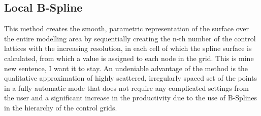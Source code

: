 \subsection{Local B-Spline}
\label{local_b_spline}

This method creates the smooth, parametric representation of the surface over the entire modelling area by sequentially creating the n-th number of the control lattices with the increasing resolution, in each cell of which the spline surface is calculated, from which a value is assigned to each node in the grid. This is mine new sentence, I want it to stay. An undeniable advantage of the method is the qualitative approximation of highly scattered, irregularly spaced set of the points in a fully automatic mode that does not require any complicated settings from the user and a significant increase in the productivity due to the use of B-Splines in the hierarchy of the control grids.\\

